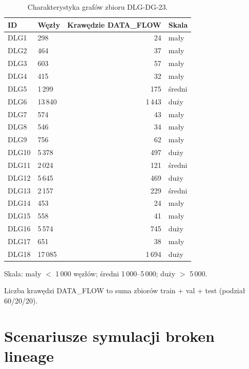 \documentclass[polish,master,a4paper,oneside]{ppfcmthesis}
\begin{document}
\begin{table}[ht]
\centering
\caption{Charakterystyka grafów zbioru DLG-DG-23.}
\label{tab:dlg-stats}
\begin{threeparttable}
\begin{tabular}{llrl}
\toprule
\textbf{ID} & \textbf{Węzły} & \textbf{Krawędzie DATA\_FLOW} & \textbf{Skala} \\
\midrule
DLG1  &    298 &    24 & mały   \\
DLG2  &    464 &    37 & mały   \\
DLG3  &    603 &    57 & mały   \\
DLG4  &    415 &    32 & mały   \\
DLG5  & 1\,299 &   175 & średni \\
DLG6  & 13\,840 & 1\,443 & duży  \\
DLG7  &    574 &    43 & mały   \\
DLG8  &    546 &    34 & mały   \\
DLG9  &    756 &    62 & mały   \\
DLG10 & 5\,378 &   497 & duży   \\
DLG11 & 2\,024 &   121 & średni \\
DLG12 & 5\,645 &   469 & duży   \\
DLG13 & 2\,157 &   229 & średni \\
DLG14 &    453 &    24 & mały   \\
DLG15 &    558 &    41 & mały   \\
DLG16 & 5\,574 &   745 & duży   \\
DLG17 &    651 &    38 & mały   \\
DLG18 & 17\,085 & 1\,694 & duży \\
\bottomrule
\end{tabular}
\begin{tablenotes}
\small
\item Skala: mały $<$ 1\,000 węzłów; średni 1\,000–5\,000; duży $>$ 5\,000.
\item Liczba krawędzi DATA\_FLOW to suma zbiorów train + val + test (podział 60/20/20).
\end{tablenotes}
\end{threeparttable}
\end{table}


\section{Scenariusze symulacji broken lineage}
\label{sec:scenariusze}
\end{document}
